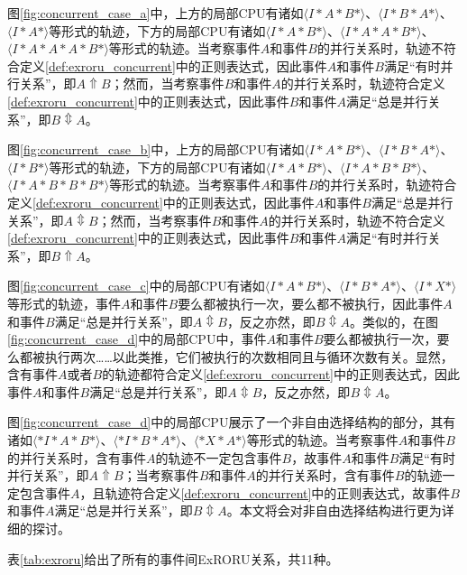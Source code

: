 图\ref{fig:concurrent_case_a}中，上方的局部CPU有诸如$\langle I*A*B*\rangle$、$\langle I*B*A*\rangle$、$\langle I*A*\rangle$等形式的轨迹，下方的局部CPU有诸如$\langle I*A*B*\rangle$、$\langle I*A*A*B*\rangle$、$\langle I*A*A*A*B*\rangle$等形式的轨迹。当考察事件$A$和事件$B$的并行关系时，轨迹不符合定义\ref{def:exroru_concurrent}中的正则表达式，因此事件$A$和事件$B$满足“有时并行关系”，即$A\Uparrow B$；然而，当考察事件$B$和事件$A$的并行关系时，轨迹符合定义\ref{def:exroru_concurrent}中的正则表达式，因此事件$B$和事件$A$满足“总是并行关系”，即$B\Updownarrow A$。

图\ref{fig:concurrent_case_b}中，上方的局部CPU有诸如$\langle I*A*B*\rangle$、$\langle I*B*A*\rangle$、$\langle I*B*\rangle$等形式的轨迹，下方的局部CPU有诸如$\langle I*A*B*\rangle$、$\langle I*A*B*B*\rangle$、$\langle I*A*B*B*B*\rangle$等形式的轨迹。当考察事件$A$和事件$B$的并行关系时，轨迹符合定义\ref{def:exroru_concurrent}中的正则表达式，因此事件$A$和事件$B$满足“总是并行关系”，即$A\Updownarrow B$；然而，当考察事件$B$和事件$A$的并行关系时，轨迹不符合定义\ref{def:exroru_concurrent}中的正则表达式，因此事件$B$和事件$A$满足“有时并行关系”，即$B\Uparrow A$。

图\ref{fig:concurrent_case_c}中的局部CPU有诸如$\langle I*A*B*\rangle$、$\langle I*B*A*\rangle$、$\langle I*X*\rangle$等形式的轨迹，事件$A$和事件$B$要么都被执行一次，要么都不被执行，因此事件$A$和事件$B$满足“总是并行关系”，即$A\Updownarrow B$，反之亦然，即$B\Updownarrow A$。类似的，在图\ref{fig:concurrent_case_d}中的局部CPU中，事件$A$和事件$B$要么都被执行一次，要么都被执行两次……以此类推，它们被执行的次数相同且与循环次数有关。显然，含有事件$A$或者$B$的轨迹都符合定义\ref{def:exroru_concurrent}中的正则表达式，因此事件$A$和事件$B$满足“总是并行关系”，即$A\Updownarrow B$，反之亦然，即$B\Updownarrow A$。

图\ref{fig:concurrent_case_d}中的局部CPU展示了一个非自由选择结构的部分，其有诸如$\langle *I*A*B*\rangle$、$\langle *I*B*A*\rangle$、$\langle *X*A*\rangle$等形式的轨迹。当考察事件$A$和事件$B$的并行关系时，含有事件$A$的轨迹不一定包含事件$B$，故事件$A$和事件$B$满足“有时并行关系”，即$A\Uparrow B$；当考察事件$B$和事件$A$的并行关系时，含有事件$B$的轨迹一定包含事件$A$，且轨迹符合定义\ref{def:exroru_concurrent}中的正则表达式，故事件$B$和事件$A$满足“总是并行关系”，即$B\Updownarrow A$。本文将会对非自由选择结构进行更为详细的探讨。

表\ref{tab:exroru}给出了所有的事件间ExRORU关系，共11种。


